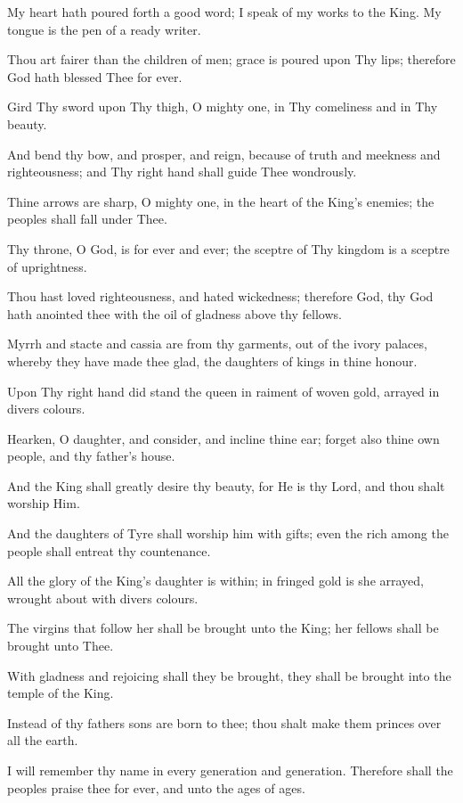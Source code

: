 My heart hath poured forth a good word; I speak of my works to the King. My tongue is the pen of a ready writer.

Thou art fairer than the children of men; grace is poured upon Thy lips; therefore God hath blessed Thee for ever.

Gird Thy sword upon Thy thigh, O mighty one, in Thy comeliness and in Thy beauty.

And bend thy bow, and prosper, and reign, because of truth and meekness and righteousness; and Thy right hand shall guide Thee wondrously.

Thine arrows are sharp, O mighty one, in the heart of the King’s enemies; the peoples shall fall under Thee.

Thy throne, O God, is for ever and ever; the sceptre of Thy kingdom is a sceptre of uprightness.

Thou hast loved righteousness, and hated wickedness; therefore God, thy God hath anointed thee with the oil of gladness above thy fellows.

Myrrh and stacte and cassia are from thy garments, out of the ivory palaces, whereby they have made thee glad, the daughters of kings in thine honour.

Upon Thy right hand did stand the queen in raiment of woven gold, arrayed in divers colours.

Hearken, O daughter, and consider, and incline thine ear; forget also thine own people, and thy father's house.

And the King shall greatly desire thy beauty, for He is thy Lord, and thou shalt worship Him.

And the daughters of Tyre shall worship him with gifts; even the rich among the people shall entreat thy countenance.

All the glory of the King’s daughter is within; in fringed gold is she arrayed, wrought about with divers colours.

The virgins that follow her shall be brought unto the King; her fellows shall be brought unto Thee.

With gladness and rejoicing shall they be brought, they shall be brought into the temple of the King.

Instead of thy fathers sons are born to thee; thou shalt make them princes over all the earth.

I will remember thy name in every generation and generation. Therefore shall the peoples praise thee for ever, and unto the ages of ages.
